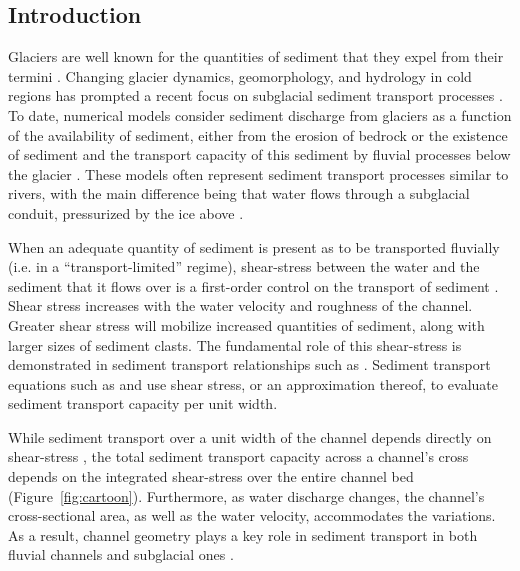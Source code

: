 \documentclass[11pt]{article}
\begin{document}
\begin{spacing}{1}
  \section{Introduction}
   
  Glaciers are well known for the quantities of sediment that they expel from their termini \citep{hallet1996}.
  Changing glacier dynamics, geomorphology, and hydrology in cold regions has prompted a recent focus on subglacial sediment transport processes \citep[e.g.][]{zhang2022}.
  To date, numerical models consider sediment discharge from glaciers as a function of the availability of sediment, either from the erosion of bedrock or the existence of sediment and the transport capacity of this sediment by fluvial processes below the glacier \citep{creyts2013,brinkerhoff2017,beaud2018,delaney2019}.
  These models often represent sediment transport processes similar to rivers, with the main difference being that water flows through a subglacial conduit, pressurized by the ice above \citep{rothlisberger1972}.

  When an adequate quantity of sediment is present as to be transported fluvially (i.e. in a ``transport-limited'' regime), shear-stress between the water and the sediment that it flows over is a first-order control on the transport of sediment \citep{shields1936}.
  Shear stress increases with the water velocity and roughness of the channel.
  Greater shear stress will mobilize increased quantities of sediment, along with larger sizes of sediment clasts.
  The fundamental role of this shear-stress is demonstrated in sediment transport relationships such as \citet{shields1936}.
  Sediment transport equations such as \citet{meyer1948}  and \citet{engelund1967} use shear stress, or an approximation thereof, to evaluate sediment transport capacity per unit width.

  While sediment transport over a unit width of the channel depends directly on shear-stress \citep[e.g.][]{meyer1948}, the total sediment transport capacity across a channel's cross depends on the integrated shear-stress over the entire channel bed (Figure~\ref{fig:cartoon}).
  Furthermore, as water discharge changes, the channel's cross-sectional area, as well as the water velocity, accommodates the variations.
  As a result, channel geometry plays a key role in sediment transport in both fluvial channels and subglacial ones \citep[e.g.][]{church2006,delaney2019}.
  

\end{spacing}
\end{document}
